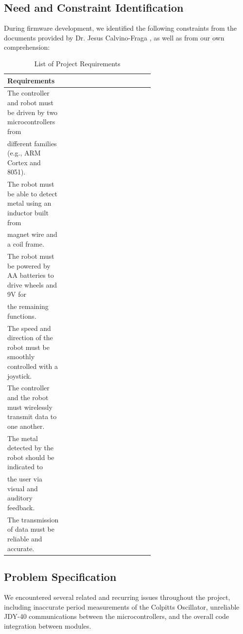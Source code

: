 \documentclass{article}
\begin{document}
\subsection{Need and Constraint Identification}
During firmware development, we identified the following constraints from the
documents provided by Dr. Jesus Calvino-Fraga \cite{RequirementsPDF}, as well as from our own comprehension:

\begin{table}[ht]
    \center
    \begin{tabular}{|l|p{0.6\linewidth}|}
        \hline
        \textbf{Requirements} \\ \hline
        The controller and robot must be driven by two microcontrollers from \\
        different families (e.g., ARM Cortex and 8051). \\ \hline
        The robot must be able to detect metal using an inductor built from \\
        magnet wire and a coil frame. \\ \hline
        The robot must be powered by AA batteries to drive wheels and 9V for \\
        the remaining functions. \\ \hline
        The speed and direction of the robot must be smoothly controlled with a joystick. \\ \hline
        The controller and the robot must wirelessly transmit data to one another. \\ \hline
        The metal detected by the robot should be indicated to \\
        the user via visual and auditory feedback. \\ \hline
        The transmission of data must be reliable and accurate. \\ \hline
    \end{tabular}
    \caption{List of Project Requirements}
    \label{table:project_requirements}
\end{table}

\subsection{Problem Specification}

We encountered several related and recurring issues throughout the project, including inaccurate period measurements of the
Colpitts Oscillator, unreliable JDY-40 communications between the microcontrollers, and
the overall code integration between modules.
\end{document}
